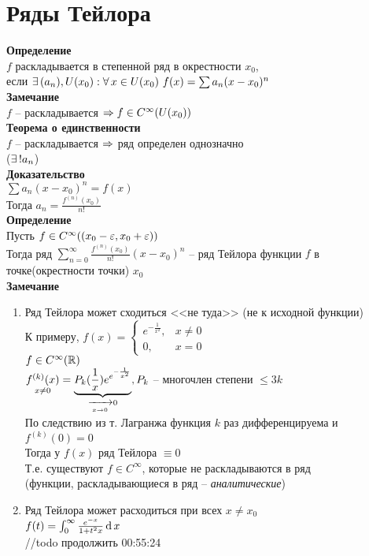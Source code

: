 \documentclass[12pt]{article}
\begin{document}
\section{Ряды Тейлора}
\textbf{Определение}\\
$f$ раскладывается в степенной ряд в окрестности $x_0$,\\
если $\ex (a_n), U(x_0): \fall x\in U(x_0)\ f(x) = \sum a_n(x-x_0)^n$\\
\textbf{Замечание}\\
$f$ -- раскладывается $\Rto f\in C^\infty(U(x_0))$\\
\textbf{Теорема о единственности}\\
$f$ -- раскладывается $\Rto$ ряд определен однозначно\\
($\ex! a_n$)\\
\textbf{Доказательство}\\
$\sum a_n(x-x_0)^n = f(x)$\\
Тогда $a_n = \frac{f^{(n)}(x_0)}{n!}$\\
\textbf{Определение}\\
Пусть $f\in C^{\infty} ((x_0 - \eps, x_0 + \eps))$\\
Тогда ряд $\sum_{n=0}^\infty \frac{f^{(n)}(x_0)}{n!}(x-x_0)^n$ -- ряд Тейлора функции $f$ в точке(окрестности точки) $x_0$\\
\textbf{Замечание}
\begin{enumerate}
    \item Ряд Тейлора может сходиться <<не туда>> (не к исходной функции)\\
    К примеру, $f(x) = \left\{\begin{array}{cc}
        e^{-\frac1{x^2}}, & x\neq0\\
        0, & x = 0
    \end{array}\right.$\\
    $f\in C^\infty(\Rset)$\\
    $\us{x\neq 0}{f^{(k)}(x)} = \ub{\xrto[x\rto 0]{} 0}{P_k(\frac1x)e^{e^{-\frac1{x^2}}}}, P_k$ -- многочлен степени $\leq 3k$\\
    По следствию из т. Лагранжа функция $k$ раз дифференцируема и $f^{(k)}(0) = 0$\\
    Тогда у $f(x)$ ряд Тейлора $\equiv 0$\\
    Т.е. существуют $f \in C^\infty$, которые не раскладываются в ряд\\
    (функции, раскладывающиеся в ряд -- \textit{аналитические})
    \item Ряд Тейлора может расходиться при всех $x\neq x_0$\\
    $f(t) = \int_0^\infty \frac{e^{-x}}{1+t^2x}\df x$\\
    //todo продолжить 00:55:24
\end{enumerate}
\end{document}
